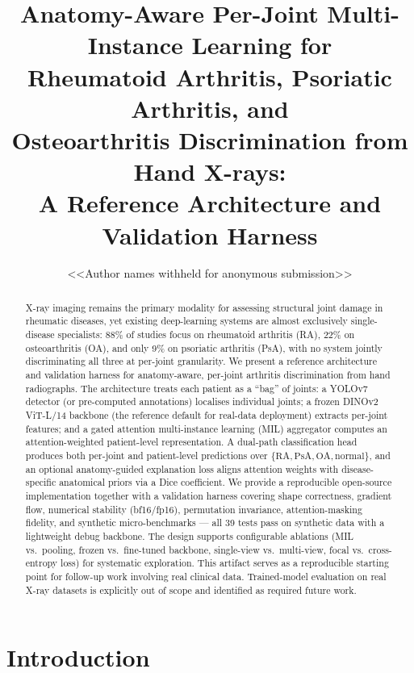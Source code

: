 \documentclass{article}
\title{Anatomy-Aware Per-Joint Multi-Instance Learning for \\ Rheumatoid Arthritis, Psoriatic Arthritis, and \\ Osteoarthritis Discrimination from Hand X-rays: \\ A Reference Architecture and Validation Harness}
\author{%
  \textless\textless Author names withheld for anonymous submission\textgreater\textgreater
}
\begin{document}
\maketitle

\begin{abstract}
X-ray imaging remains the primary modality for assessing structural joint damage in rheumatic diseases, yet existing deep-learning systems are almost exclusively single-disease specialists: 88\% of studies focus on rheumatoid arthritis (RA), 22\% on osteoarthritis (OA), and only 9\% on psoriatic arthritis (PsA), with no system jointly discriminating all three at per-joint granularity. We present a reference architecture and validation harness for anatomy-aware, per-joint arthritis discrimination from hand radiographs. The architecture treats each patient as a ``bag'' of joints: a YOLOv7 detector (or pre-computed annotations) localises individual joints; a frozen DINOv2 ViT-L/14 backbone (the reference default for real-data deployment) extracts per-joint features; and a gated attention multi-instance learning (MIL) aggregator computes an attention-weighted patient-level representation. A dual-path classification head produces both per-joint and patient-level predictions over $\{\text{RA}, \text{PsA}, \text{OA}, \text{normal}\}$, and an optional anatomy-guided explanation loss aligns attention weights with disease-specific anatomical priors via a Dice coefficient. We provide a reproducible open-source implementation together with a validation harness covering shape correctness, gradient flow, numerical stability (bf16/fp16), permutation invariance, attention-masking fidelity, and synthetic micro-benchmarks --- all 39 tests pass on synthetic data with a lightweight debug backbone. The design supports configurable ablations (MIL vs.\ pooling, frozen vs.\ fine-tuned backbone, single-view vs.\ multi-view, focal vs.\ cross-entropy loss) for systematic exploration. This artifact serves as a reproducible starting point for follow-up work involving real clinical data. Trained-model evaluation on real X-ray datasets is explicitly out of scope and identified as required future work.
\end{abstract}

\section{Introduction}
\end{document}
